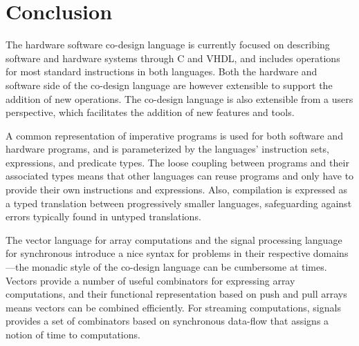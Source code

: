 \documentclass[../paper.tex]{subfiles}
\begin{document}
\section{Conclusion}
\label{conc}

The hardware software co-design language is currently focused on describing software and hardware systems through C and VHDL, and includes operations for most standard instructions in both languages. Both the hardware and software side of the co-design language are however extensible to support the addition of new operations. The co-design language is also extensible from a users perspective, which facilitates the addition of new features and tools.

A common representation of imperative programs is used for both software and hardware programs, and is parameterized by the languages' instruction sets, expressions, and predicate types. The loose coupling between programs and their associated types means that other languages can reuse programs and only have to provide their own instructions and expressions. Also, compilation is expressed as a typed translation between progressively smaller languages, safeguarding against errors typically found in untyped translations.

The vector language for array computations and the signal processing language for synchronous introduce a nice syntax for problems in their respective domains---the monadic style of the co-design language can be cumbersome at times. Vectors provide a number of useful combinators for expressing array computations, and their functional representation based on push and pull arrays means vectors can be combined efficiently. For streaming computations, signals provides a set of combinators based on synchronous data-flow that assigns a notion of time to computations.
\end{document}
